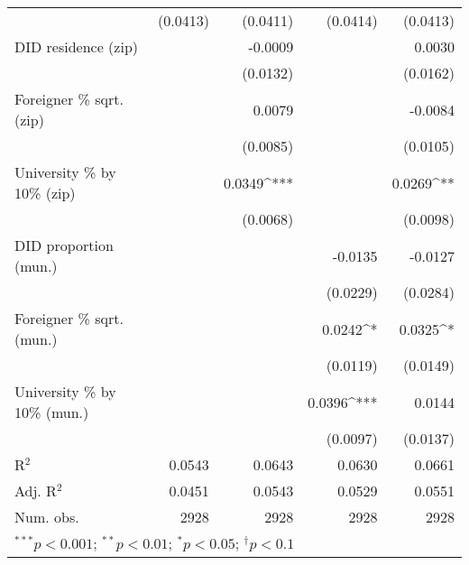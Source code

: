 \begin{tabular}{l D{.}{.}{4.11} D{.}{.}{4.11} D{.}{.}{4.11} D{.}{.}{4.11}}
                                  & (0.0413)          & (0.0411)          & (0.0414)          & (0.0413)          \\
DID residence (zip)               &                   & -0.0009           &                   & 0.0030            \\
                                  &                   & (0.0132)          &                   & (0.0162)          \\
Foreigner \% sqrt. (zip)          &                   & 0.0079            &                   & -0.0084           \\
                                  &                   & (0.0085)          &                   & (0.0105)          \\
University \% by 10\% (zip)       &                   & 0.0349^{***}      &                   & 0.0269^{**}       \\
                                  &                   & (0.0068)          &                   & (0.0098)          \\
DID proportion (mun.)             &                   &                   & -0.0135           & -0.0127           \\
                                  &                   &                   & (0.0229)          & (0.0284)          \\
Foreigner \% sqrt. (mun.)         &                   &                   & 0.0242^{*}        & 0.0325^{*}        \\
                                  &                   &                   & (0.0119)          & (0.0149)          \\
University \% by 10\% (mun.)      &                   &                   & 0.0396^{***}      & 0.0144            \\
                                  &                   &                   & (0.0097)          & (0.0137)          \\
\midrule
R$^2$                             & 0.0543            & 0.0643            & 0.0630            & 0.0661            \\
Adj. R$^2$                        & 0.0451            & 0.0543            & 0.0529            & 0.0551            \\
Num. obs.                         & 2928              & 2928              & 2928              & 2928              \\
\bottomrule
{}
\end{tabular}
